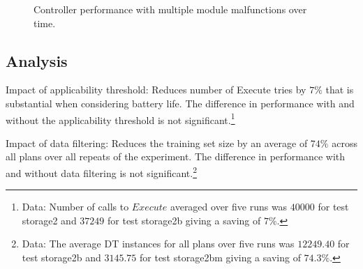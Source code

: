 \begin{figure}[ht]
\begin{center}

\end{center}
\caption{Controller performance with multiple module malfunctions over time.}
\label{fig:experiment1}
\end{figure}



\subsection{Analysis}\label{subsec:analysis}

Impact of applicability threshold: Reduces number of Execute tries by $7\%$ that is substantial when considering battery life. The difference in performance with and without the applicability threshold is not significant.\footnote{Data: Number of calls to $Execute$ averaged over five runs was $40000$ for test storage2 and $37249$ for test storage2b giving a saving of $7\%$.}

Impact of data filtering: Reduces the training set size by an average of $74\%$ across all plans over all repeats of the experiment. The difference in performance with and without data filtering is not significant.\footnote{Data: The average DT instances for all plans over five runs was $12249.40$ for test storage2b and $3145.75$ for test storage2bm giving a saving of $74.3\%$.}


